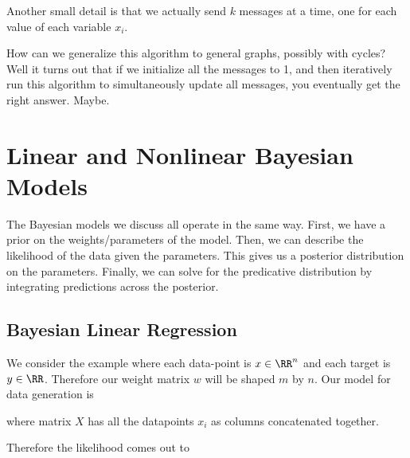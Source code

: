 \documentclass[12pt]{article}
\begin{document}
Another small detail is that we actually send $k$ messages at a time, one for each value of each variable $x_i$. 

How can we generalize this algorithm to general graphs, possibly with cycles? Well it turns out that if we initialize all the messages to 1, and then iteratively run this algorithm to simultaneously update all messages, you eventually get the right answer. Maybe. 

\section{Linear and Nonlinear Bayesian Models}

The Bayesian models we discuss all operate in the same way. First, we have a prior on the weights/parameters of the model. Then, we can describe the likelihood of the data given the parameters. This gives us a posterior distribution on the parameters. Finally, we can solve for the predicative distribution by integrating predictions across the posterior. 

\subsection{Bayesian Linear Regression}

We consider the example where each data-point is $x \in \RR^n$ and each target is $y \in \RR$. Therefore our weight matrix $w$ will be shaped $m$ by $n$. Our model for data generation is


where matrix $X$ has all the datapoints $x_i$ as columns concatenated together.

Therefore the likelihood comes out to

\end{document}
